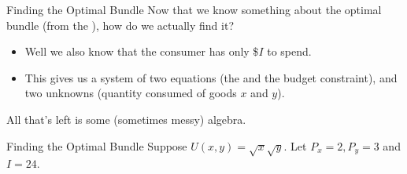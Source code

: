 \documentclass[12pt,t]{beamer}
\begin{document}
\begin{frame}{Finding the Optimal Bundle}
  Now that we know something about the optimal bundle (from the ), how do we actually find it?

  \begin{itemize}
    \item Well we also know that the consumer has only  \$$I$ to spend.

    \item This gives us a system of two equations (the  and the budget constraint), and two unknowns (quantity consumed of goods $x$ and $y$).

  \end{itemize}
  
  \pause\bigskip
  All that's left is some (sometimes messy) algebra.
\end{frame}

\begin{frame}{Finding the Optimal Bundle}
  Suppose $U(x,y) = \sqrt{x}\sqrt{y}$. Let $P_x = 2, P_y=3$ and $I = 24$.


\end{frame}
\end{document}

